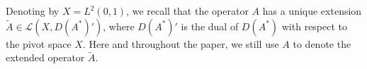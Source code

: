 \documentclass[review]{elsarticle}
\newtheorem{lemma}[theorem]{Lemma}
\numberwithin{equation}{section}
\begin{document}
{Denoting by $X=L^2(0,1)$, we recall that the operator $A$ has a unique extension $\tilde{A}\in \mathcal{L}(X,D(A^*)')$, where $D(A^*)'$ is the dual of $D(A^*)$ with respect to the pivot space $X$. Here and throughout the paper, we still use $A$ to denote the extended operator $\tilde{A}$.}
\end{document}

